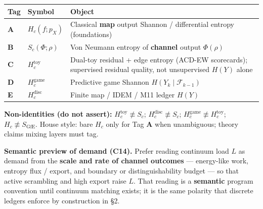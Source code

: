 \documentclass[
  11pt,
]{article}
\newcounter{none} %
\begin{document}
{\def\LTcaptype{none} %
\begin{longtable}[]{@{}
  >{\raggedright\arraybackslash}p{}
  >{\raggedright\arraybackslash}p{}
  >{\raggedright\arraybackslash}p{}@{}}
\toprule\noalign{}
\begin{minipage}[b]{\linewidth}\raggedright
Tag
\end{minipage} & \begin{minipage}[b]{\linewidth}\raggedright
Symbol
\end{minipage} & \begin{minipage}[b]{\linewidth}\raggedright
Object
\end{minipage} \\
\midrule\noalign{}
\endhead
\bottomrule\noalign{}
\endlastfoot
\textbf{A} & \(H_c(f;p_X)\) & Classical \textbf{map} output Shannon /
differential entropy (foundations) \\
\textbf{B} & \(S_c(\Phi;\rho)\) & Von Neumann entropy of
\textbf{channel} output \(\Phi(\rho)\) \\
\textbf{C} & \(H_c^{\mathrm{toy}}\) & Dual-toy residual + edge entropy
(ACD-EW scorecards); supervised residual quality, not unsupervised
\(H(Y)\) alone \\
\textbf{D} & \(H_c^{\mathrm{game}}\) & Predictive game Shannon
\(H(Y_k\mid\mathcal{F}_{k-1})\) \\
\textbf{E} & \(H_c^{\mathrm{disc}}\) & Finite map / IDEM / M11 ledger
\(H(Y)\) \\
\end{longtable}
}

\textbf{Non-identities (do not assert):}
\(H_c^{\mathrm{toy}}\not\equiv S_c\);
\(H_c^{\mathrm{disc}}\not\equiv S_c\);
\(H_c^{\mathrm{game}}\not\equiv H_c^{\mathrm{toy}}\);
\(H_c\not\equiv S_{\mathrm{GfE}}\). House style: bare \(H_c\) only for
Tag \textbf{A} when unambiguous; theory claims mixing layers must tag.

\textbf{Semantic preview of demand (C14).} Prefer reading continuum load
\(L\) as demand from the \textbf{scale and rate of channel outcomes} ---
energy-like work, entropy flux / export, and boundary or
distinguishability budget --- so that active scrambling and high export
raise \(L\). That reading is a \textbf{semantic} program convention
until continuum matching exists; it is the same polarity that discrete
ledgers enforce by construction in §2.
\end{document}

